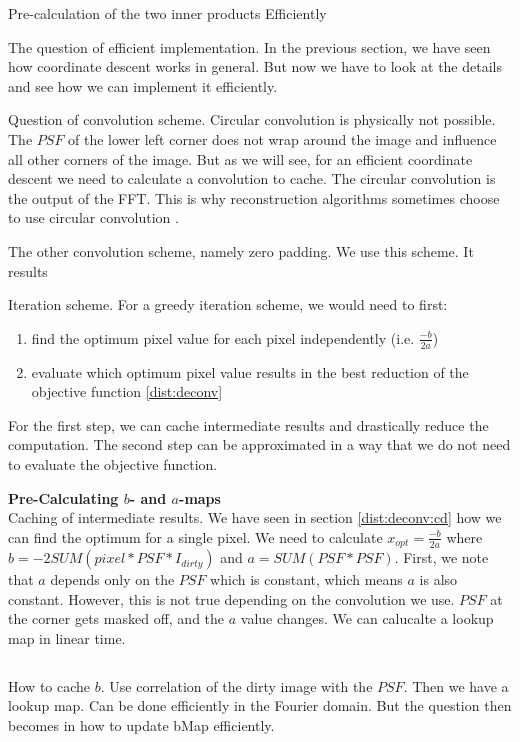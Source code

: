 Pre-calculation of the two inner products
Efficiently



The question of efficient implementation. In the previous section, we have seen how coordinate descent works in general. But now we have to look at the details and see how we can implement it efficiently.

Question of convolution scheme. 
Circular convolution is physically not possible. The $PSF$ of the lower left corner does not wrap around the image and influence all other corners of the image. But as we will see, for an efficient coordinate descent we need to calculate a convolution to cache. The circular convolution is the output of the FFT. This is why reconstruction algorithms sometimes choose to use circular convolution \cite{ferrari2014distributed}.

The other convolution scheme, namely zero padding. We use this scheme. It results 

Iteration scheme. For a greedy iteration scheme, we would need to first:
\begin{enumerate}
	\item find the optimum pixel value for each pixel independently (i.e. $\frac{-b}{2a}$)
	\item evaluate which optimum pixel value results in the best reduction of the objective function \eqref{dist:deconv}
\end{enumerate}

For the first step, we can cache intermediate results and drastically reduce the computation. The second step can be approximated in a way that we do not need to evaluate the objective function.

\textbf{Pre-Calculating $b$- and $a$-maps}\\
Caching of intermediate results. We have seen in section \ref{dist:deconv:cd} how we can find the optimum for a single pixel. We need to calculate  $x_{opt} = \frac{-b}{2a}$ where  $b = -2 SUM( pixel*PSF*I_{dirty})$ and $a = SUM(PSF * PSF)$. First, we note that $a$ depends only on the $PSF$ which is constant, which means $a$ is also constant. However, this is not true depending on the convolution we use.
$PSF$ at the corner gets masked off, and the $a$ value changes.
We can calucalte a lookup map in linear time.
\begin{lstlisting}

\end{lstlisting}

How to cache $b$. Use correlation of the dirty image with the $PSF$. Then we have a lookup map. Can be done efficiently in the Fourier domain. But the question then becomes in how to update bMap efficiently.


